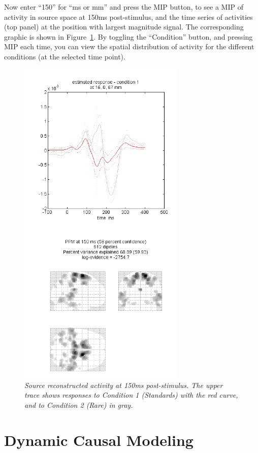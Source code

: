 Now enter ``150'' for ``ms or mm'' and press the MIP button, to see a MIP of activity in source space at 150ms post-stimulus, and the time series of activities (top panel) at the position with largest magnitude signal. The corresponding graphic is shown in Figure~\ref{invert}. By toggling the ``Condition'' button, and pressing MIP each time, you can view the spatial distribution of activity for the different conditions (at the selected time point).
\begin{figure}
\begin{center}
\includegraphics[width=80mm]{mmn/invert}
\caption{\em Source reconstructed activity at 150ms post-stimulus.
The upper trace shows responses to Condition 1 (Standards) with the red curve, and to Condition 2 (Rare) in gray.
\label{invert}}
\end{center}
\end{figure}

\section{Dynamic Causal Modeling}

